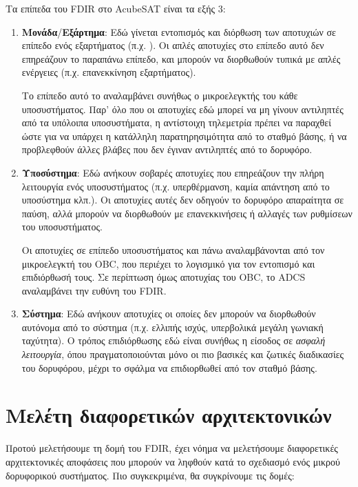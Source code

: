 \documentclass[a4paper,nobib]{tufte-book}
\begin{document}
Τα επίπεδα του \acs{FDIR} στο AcubeSAT είναι τα εξής 3:
\begin{enumerate}[label=Επίπεδο \arabic*]
	\item \textbf{Μονάδα}/\textbf{Εξάρτημα}: Εδώ γίνεται εντοπισμός και διόρθωση των αποτυχιών σε επίπεδο ενός εξαρτήματος (π.χ. ). Οι απλές αποτυχίες στο επίπεδο αυτό δεν επηρεάζουν το παραπάνω επίπεδο, και μπορούν να διορθωθούν τυπικά με απλές ενέργειες (π.χ. επανεκκίνηση εξαρτήματος).
	
	Το επίπεδο αυτό το αναλαμβάνει συνήθως ο μικροελεγκτής του κάθε υποσυστήματος. Παρ' όλο που οι αποτυχίες εδώ μπορεί να μη γίνουν αντιληπτές από τα υπόλοιπα υποσυστήματα, η αντίστοιχη τηλεμετρία πρέπει να παραχθεί ώστε για να υπάρχει η κατάλληλη παρατηρησιμότητα από το σταθμό βάσης, ή να προβλεφθούν άλλες βλάβες που δεν έγιναν αντιληπτές από το δορυφόρο.
	\item \textbf{Υποσύστημα}: Εδώ ανήκουν σοβαρές αποτυχίες που επηρεάζουν την πλήρη λειτουργία ενός υποσυστήματος (π.χ. υπερθέρμανση, καμία απάντηση από το υποσύστημα κλπ.). Οι αποτυχίες αυτές δεν οδηγούν το δορυφόρο απαραίτητα σε παύση, αλλά μπορούν να διορθωθούν με επανεκκινήσεις ή αλλαγές των ρυθμίσεων του υποσυστήματος.
	
	Οι αποτυχίες σε επίπεδο υποσυστήματος και πάνω αναλαμβάνονται από τον μικροελεγκτή του \acf{OBC}, που περιέχει το λογισμικό για τον εντοπισμό και επιδιόρθωσή τους. Σε περίπτωση όμως αποτυχίας του \acf{OBC}, το \acf{ADCS} αναλαμβάνει την ευθύνη του \acf{FDIR}.
	\item \textbf{Σύστημα}: Εδώ ανήκουν αποτυχίες οι οποίες δεν μπορούν να διορθωθούν αυτόνομα από το σύστημα (π.χ. ελλιπής ισχύς, υπερβολικά μεγάλη γωνιακή ταχύτητα). Ο τρόπος επιδιόρθωσης εδώ είναι συνήθως η είσοδος σε \emph{ασφαλή λειτουργία}, όπου πραγματοποιούνται μόνο οι πιο βασικές και ζωτικές διαδικασίες του δορυφόρου, μέχρι το σφάλμα να επιδιορθωθεί από τον σταθμό βάσης.
\end{enumerate}

\section{Μελέτη διαφορετικών αρχιτεκτονικών}

Προτού μελετήσουμε τη δομή του \acs{FDIR}, έχει νόημα να μελετήσουμε διαφορετικές αρχιτεκτονικές αποφάσεις που μπορούν να ληφθούν κατά το σχεδιασμό ενός μικρού δορυφορικού συστήματος. Πιο συγκεκριμένα, θα συγκρίνουμε τις δομές: \autocite{birolini_reliability_engineering_2004}
\end{document}
